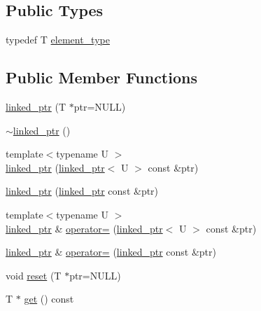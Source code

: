 \subsection*{Public Types}
\begin{DoxyCompactItemize}
\item 
typedef T \hyperlink{classtesting_1_1internal_1_1linked__ptr_a295c7d1ee4100d916514c4e4385a0063}{element\+\_\+type}
\end{DoxyCompactItemize}
\subsection*{Public Member Functions}
\begin{DoxyCompactItemize}
\item 
\hyperlink{classtesting_1_1internal_1_1linked__ptr_ae805418b9f03f14ff49649e710475dba}{linked\+\_\+ptr} (T $\ast$ptr=N\+U\+LL)
\item 
\hyperlink{classtesting_1_1internal_1_1linked__ptr_af99460fd09ca0f83e061ea480ef1a45e}{$\sim$linked\+\_\+ptr} ()
\item 
{\footnotesize template$<$typename U $>$ }\\\hyperlink{classtesting_1_1internal_1_1linked__ptr_a7597ed91006edd0467c99bd1aaab07f5}{linked\+\_\+ptr} (\hyperlink{classtesting_1_1internal_1_1linked__ptr}{linked\+\_\+ptr}$<$ U $>$ const \&ptr)
\item 
\hyperlink{classtesting_1_1internal_1_1linked__ptr_abc076b5678cc7f64306d5ecfefc93aff}{linked\+\_\+ptr} (\hyperlink{classtesting_1_1internal_1_1linked__ptr}{linked\+\_\+ptr} const \&ptr)
\item 
{\footnotesize template$<$typename U $>$ }\\\hyperlink{classtesting_1_1internal_1_1linked__ptr}{linked\+\_\+ptr} \& \hyperlink{classtesting_1_1internal_1_1linked__ptr_a82608d98869b750d9ab729f1450a9a45}{operator=} (\hyperlink{classtesting_1_1internal_1_1linked__ptr}{linked\+\_\+ptr}$<$ U $>$ const \&ptr)
\item 
\hyperlink{classtesting_1_1internal_1_1linked__ptr}{linked\+\_\+ptr} \& \hyperlink{classtesting_1_1internal_1_1linked__ptr_a1f40b5e66e6cf7b661ea116c806f952e}{operator=} (\hyperlink{classtesting_1_1internal_1_1linked__ptr}{linked\+\_\+ptr} const \&ptr)
\item 
void \hyperlink{classtesting_1_1internal_1_1linked__ptr_a95ba3b7b66ed0193c779976c6e126ab6}{reset} (T $\ast$ptr=N\+U\+LL)
\item 
T $\ast$ \hyperlink{classtesting_1_1internal_1_1linked__ptr_a0c2ba99eb3521806f83f5c4435465ce0}{get} () const

\end{DoxyCompactItemize}
